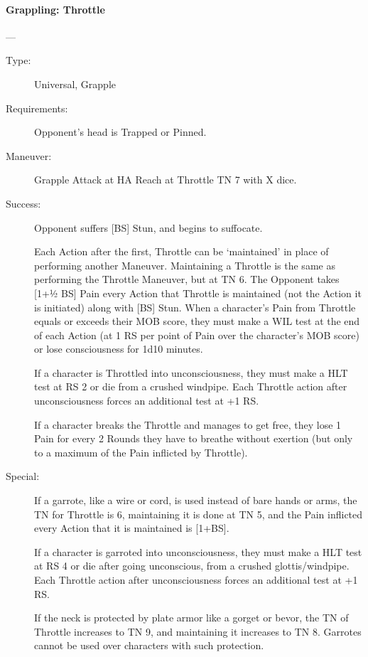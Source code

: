 \paragraph{Grappling: Throttle \large} \label{man:grappling-throttle}
---\quad {\large [X]}
\vspace{-10pt} \begin{description}
\item [Type:] Universal, Grapple
\item [Requirements:] Opponent's head is Trapped or Pinned.
\item [Maneuver:] Grapple Attack at HA Reach at Throttle TN 7 with X dice.
\item [Success:] Opponent suffers [BS] Stun, and begins to suffocate.

Each Action after the first, Throttle can be ‘maintained’ in place of performing
another Maneuver. Maintaining a Throttle is the same as performing the Throttle
Maneuver, but at TN 6. The Opponent takes [1+1⁄2 BS] Pain every Action that
Throttle is maintained (not the Action it is initiated) along with [BS] Stun.
When a character's Pain from Throttle equals or exceeds their MOB score, they
must make a WIL test at the end of each Action (at 1 RS per point of Pain over
the character's MOB score) or lose consciousness for 1d10 minutes. 

If a character is Throttled into unconsciousness, they must make a HLT test at
RS 2 or die from a crushed windpipe. Each Throttle action after unconsciousness
forces an additional test at +1 RS.   

If a character breaks the Throttle and manages to get free, they lose 1 Pain for
every 2 Rounds they have to breathe without exertion (but only to a maximum of
the Pain inflicted by Throttle). 
\item [Special:] If a garrote, like a wire or cord, is used instead of bare
  hands or arms, the TN for Throttle is 6, maintaining it is done at TN 5, and
  the Pain inflicted every Action that it is maintained is [1+BS].

  If a character is garroted into unconsciousness, they must make a HLT test at
  RS 4 or die after going unconscious, from a crushed glottis/windpipe. Each
  Throttle action after unconsciousness forces an additional test at +1 RS.

  If the neck is protected by plate armor like a gorget or bevor, the TN of
  Throttle increases to TN 9, and maintaining it increases to TN 8. Garrotes
  cannot be used over characters with such protection.
\end{description} 

